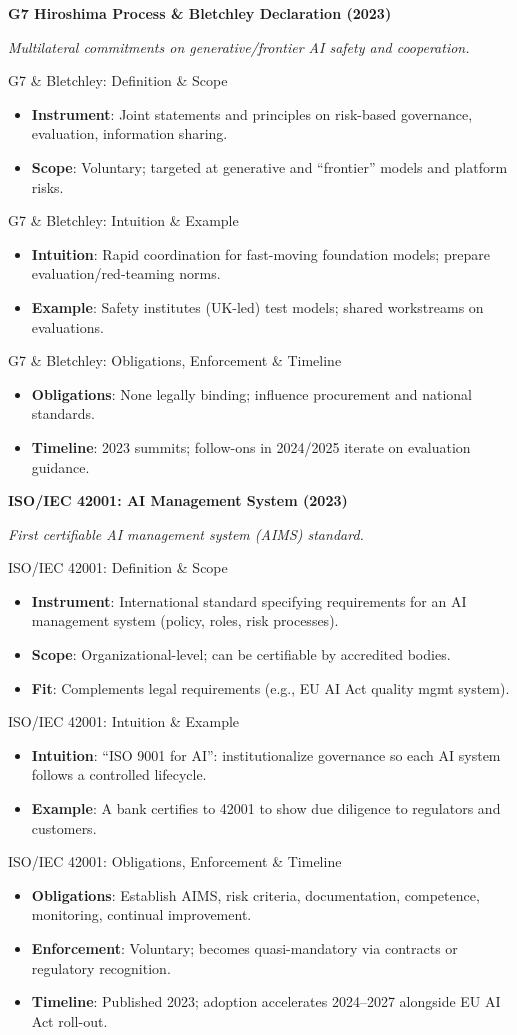 \documentclass[aspectratio=169]{beamer}
\newcommand{\RegTitle}[2]{%
  \begin{frame}[plain]
    \centering
    \vfill
    {\usebeamerfont{title}\usebeamercolor[fg]{title}\LARGE \textbf{#1}\par}
    \vspace{0.4em}
    {\small \itshape #2\par}
    \vfill
  \end{frame}
}
\newcommand{\RegDef}[2]{%
  \begin{frame}{#1: Definition \& Scope}
    \begin{itemize}
      #2
    \end{itemize}
  \end{frame}
}
\newcommand{\RegIntuition}[2]{%
  \begin{frame}{#1: Intuition \& Example}
    \begin{itemize}
      #2
    \end{itemize}
  \end{frame}
}
\newcommand{\RegCompliance}[2]{%
  \begin{frame}{#1: Obligations, Enforcement \& Timeline}
    \begin{itemize}
      #2
    \end{itemize}
  \end{frame}
}
\begin{document}
\RegTitle{G7 Hiroshima Process \& Bletchley Declaration (2023)}{Multilateral commitments on generative/frontier AI safety and cooperation.}
\RegDef{G7 \& Bletchley}{%
  \item \textbf{Instrument}: Joint statements and principles on risk-based governance, evaluation, information sharing.
  \item \textbf{Scope}: Voluntary; targeted at generative and ``frontier'' models and platform risks.
}
\RegIntuition{G7 \& Bletchley}{%
  \item \textbf{Intuition}: Rapid coordination for fast-moving foundation models; prepare evaluation/red-teaming norms.
  \item \textbf{Example}: Safety institutes (UK-led) test models; shared workstreams on evaluations.
}
\RegCompliance{G7 \& Bletchley}{%
  \item \textbf{Obligations}: None legally binding; influence procurement and national standards.
  \item \textbf{Timeline}: 2023 summits; follow-ons in 2024/2025 iterate on evaluation guidance.
}

\RegTitle{ISO/IEC 42001: AI Management System (2023)}{First certifiable AI management system (AIMS) standard.}
\RegDef{ISO/IEC 42001}{%
  \item \textbf{Instrument}: International standard specifying requirements for an AI management system (policy, roles, risk processes).
  \item \textbf{Scope}: Organizational-level; can be certifiable by accredited bodies.
  \item \textbf{Fit}: Complements legal requirements (e.g., EU AI Act quality mgmt system).
}
\RegIntuition{ISO/IEC 42001}{%
  \item \textbf{Intuition}: ``ISO 9001 for AI'': institutionalize governance so each AI system follows a controlled lifecycle.
  \item \textbf{Example}: A bank certifies to 42001 to show due diligence to regulators and customers.
}
\RegCompliance{ISO/IEC 42001}{%
  \item \textbf{Obligations}: Establish AIMS, risk criteria, documentation, competence, monitoring, continual improvement.
  \item \textbf{Enforcement}: Voluntary; becomes quasi-mandatory via contracts or regulatory recognition.
  \item \textbf{Timeline}: Published 2023; adoption accelerates 2024--2027 alongside EU AI Act roll-out.
}
\end{document}
